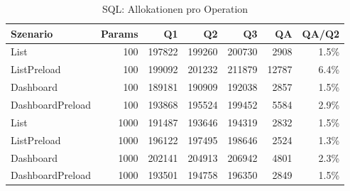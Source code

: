 \begin{table}[ht]
\centering
\caption{SQL: Allokationen pro Operation}
\begin{tabular}{lrrrrrr}
\toprule
Szenario & Params & Q1 & Q2 & Q3 & QA & QA/Q2 \\
\midrule
		List & 100 & 197822 & 199260 & 200730 & 2908 & 1.5\% \\
		ListPreload & 100 & 199092 & 201232 & 211879 & 12787 & 6.4\% \\
		Dashboard & 100 & 189181 & 190909 & 192038 & 2857 & 1.5\% \\
		DashboardPreload & 100 & 193868 & 195524 & 199452 & 5584 & 2.9\% \\
		List & 1000 & 191487 & 193646 & 194319 & 2832 & 1.5\% \\
		ListPreload & 1000 & 196122 & 197495 & 198646 & 2524 & 1.3\% \\
		Dashboard & 1000 & 202141 & 204913 & 206942 & 4801 & 2.3\% \\
		DashboardPreload & 1000 & 193501 & 194758 & 196350 & 2849 & 1.5\% \\
\bottomrule
\end{tabular}
\label{tab:benchmark_sql_allocsperop}
\end{table}
	